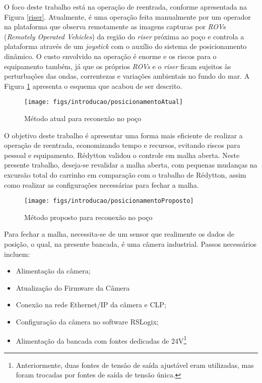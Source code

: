O foco deste trabalho está na operação de reentrada, conforme apresentada na Figura \ref{riser}. Atualmente, é uma operação feita manualmente por um operador na plataforma que observa remotamente as imagens capturas por \textit{ROV}s (\textit{Remotely Operated Vehicles}) da região do \textit{riser} próxima ao poço e controla a plataforma através de um \textit{joystick} com o auxílio do sistema de posicionamento dinâmico. O custo envolvido na operação é enorme e os riscos para o equipamento também, já que os próprios \textit{ROVs} e o \textit{riser} ficam sujeitos às perturbações das ondas, correntezas e variações ambientais no fundo do mar. A Figura \ref{posicionamentoAtual} apresenta o esquema que acabou de ser descrito.

\begin{figure}[ht!]
\centering
  \texttt{[image: figs/introducao/posicionamentoAtual]}
  \caption{Método atual para reconexão no poço \cite{redytton} \label{posicionamentoAtual}}
\end{figure}

O objetivo deste trabalho é apresentar uma forma mais eficiente de realizar a operação de reentrada, economizando tempo e recursos, evitando riscos para pessoal e equipamento. Rédytton \cite{redytton} validou o controle em malha aberta. Neste presente trabalho, deseja-se revalidar a malha aberta, com pequenas mudanças na excursão total do carrinho em comparação com o trabalho de Rédytton, assim como realizar as configurações necessárias para fechar a malha.

\begin{figure}[ht!]
\centering
  \texttt{[image: figs/introducao/posicionamentoProposto]}
  \caption{Método proposto para reconexão no poço \cite{redytton} \label{posicionamentoProposto}}
\end{figure}

Para fechar a malha, necessita-se de um sensor que realimente os dados de posição, o qual, na presente bancada, é uma câmera industrial. Passos necessários incluem: \begin{itemize}
	\item Alimentação da câmera;
	\item Atualização do Firmware da Câmera
	\item Conexão na rede Ethernet/IP da câmera e CLP;
	\item Configuração da câmera no software RSLogix;
	\item Alimentação da bancada com fontes dedicadas de 24V\footnote{Anteriormente, duas fontes de tensão de saída ajustável eram utilizadas, mas foram trocadas por fontes de saída de tensão única.}
\end{itemize}


